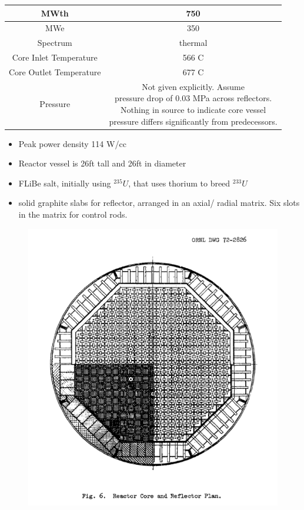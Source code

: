 \documentclass[letterpaper]{article}
\begin{document}
\begin{center}
\begin{tabular}{|c|c|}
\hline
MWth & 750 \\
\hline
MWe & 350 \\
\hline
Spectrum & thermal \\
\hline
Core Inlet Temperature & 566 C\\
\hline
Core Outlet Temperature & 677 C\\
\hline
Pressure & \makecell{Not given explicitly.  Assume\\pressure drop of 0.03 MPa across reflectors.\\Nothing in source to indicate core vessel\\pressure differs significantly from predecessors.} \\
\hline
\end{tabular}
\end{center}

\begin{itemize}
\item Peak power density 114 W/cc
\item Reactor vessel is 26ft tall and 26ft in diameter
\item FLiBe salt, initially using ${}^{235}U$, that uses thorium to breed ${}^{233}U$
\item solid graphite slabs for reflector, arranged in an axial/ radial matrix.  Six slots in the matrix for control rods.
\end{itemize}

\begin{figure}[H]
  \centering
  \includegraphics[width=1.0\linewidth]{figures/MSDRsource1.png}
  \label{fig:fig5}
\end{figure}
\end{document}
